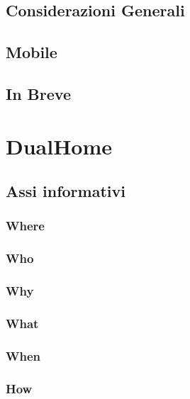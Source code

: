 \documentclass[a4paper, oneside, openany, dvipsnames, table]{article}
\begin{document}
	\subsection{Considerazioni Generali}
	\label{sec:HomeDesc}
				
	\subsection{Mobile}
			
	\subsection{In Breve}
			
			

\newpage
\section{DualHome}
\label{sez:DualHome}

	\subsection{Assi informativi}
		\subsubsection{Where}
			\label{sez:DualWhere}
			
		\subsubsection{Who}
			\label{sez:DualWho}
			
		\subsubsection{Why}
			\label{sez:DualWhy}
			
		\subsubsection{What}
			\label{sez:DualWhat}
			
		\subsubsection{When}
			\label{sez:DualWhen}
			
		\subsubsection{How}
			\label{sez:DualHow}
			
\end{document}
